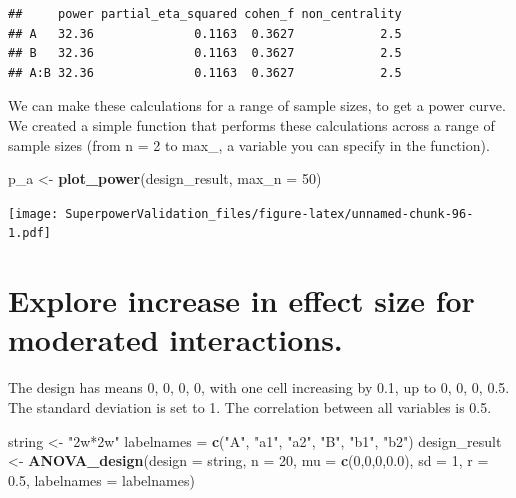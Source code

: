 \documentclass[]{book}
\newenvironment{Shaded}{\begin{snugshade}}{\end{snugshade}}
\newcommand{\DataTypeTok}[1]{\textcolor[rgb]{0.13,0.29,0.53}{#1}}
\newcommand{\DecValTok}[1]{\textcolor[rgb]{0.00,0.00,0.81}{#1}}
\newcommand{\FloatTok}[1]{\textcolor[rgb]{0.00,0.00,0.81}{#1}}
\newcommand{\KeywordTok}[1]{\textcolor[rgb]{0.13,0.29,0.53}{\textbf{#1}}}
\newcommand{\NormalTok}[1]{#1}
\newcommand{\StringTok}[1]{\textcolor[rgb]{0.31,0.60,0.02}{#1}}
\begin{document}
\begin{verbatim}
##     power partial_eta_squared cohen_f non_centrality
## A   32.36              0.1163  0.3627            2.5
## B   32.36              0.1163  0.3627            2.5
## A:B 32.36              0.1163  0.3627            2.5
\end{verbatim}

We can make these calculations for a range of sample sizes, to get a power curve. We created a simple function that performs these calculations across a range of sample sizes (from n = 2 to max\_, a variable you can specify in the function).

\begin{Shaded}
\begin{Highlighting}[]
\NormalTok{p_a <-}\StringTok{ }\KeywordTok{plot_power}\NormalTok{(design_result,}
                      \DataTypeTok{max_n =} \DecValTok{50}\NormalTok{)}
\end{Highlighting}
\end{Shaded}

\texttt{[image: SuperpowerValidation\_files/figure-latex/unnamed-chunk-96-1.pdf]}

\hypertarget{explore-increase-in-effect-size-for-moderated-interactions.}{%
\chapter{Explore increase in effect size for moderated interactions.}\label{explore-increase-in-effect-size-for-moderated-interactions.}}

The design has means 0, 0, 0, 0, with one cell increasing by 0.1, up to 0, 0, 0, 0.5. The standard deviation is set to 1. The correlation between all variables is 0.5.

\begin{Shaded}
\begin{Highlighting}[]
\NormalTok{string <-}\StringTok{ "2w*2w"}
\NormalTok{labelnames =}\StringTok{ }\KeywordTok{c}\NormalTok{(}\StringTok{"A"}\NormalTok{, }\StringTok{"a1"}\NormalTok{, }\StringTok{"a2"}\NormalTok{, }\StringTok{"B"}\NormalTok{, }\StringTok{"b1"}\NormalTok{, }\StringTok{"b2"}\NormalTok{)}
\NormalTok{design_result <-}\StringTok{ }\KeywordTok{ANOVA_design}\NormalTok{(}\DataTypeTok{design =}\NormalTok{ string,}
                              \DataTypeTok{n =} \DecValTok{20}\NormalTok{, }
                              \DataTypeTok{mu =} \KeywordTok{c}\NormalTok{(}\DecValTok{0}\NormalTok{,}\DecValTok{0}\NormalTok{,}\DecValTok{0}\NormalTok{,}\FloatTok{0.0}\NormalTok{), }
                              \DataTypeTok{sd =} \DecValTok{1}\NormalTok{, }
                              \DataTypeTok{r =} \FloatTok{0.5}\NormalTok{, }
                              \DataTypeTok{labelnames =}\NormalTok{ labelnames)}
\end{Highlighting}
\end{Shaded}
\end{document}
